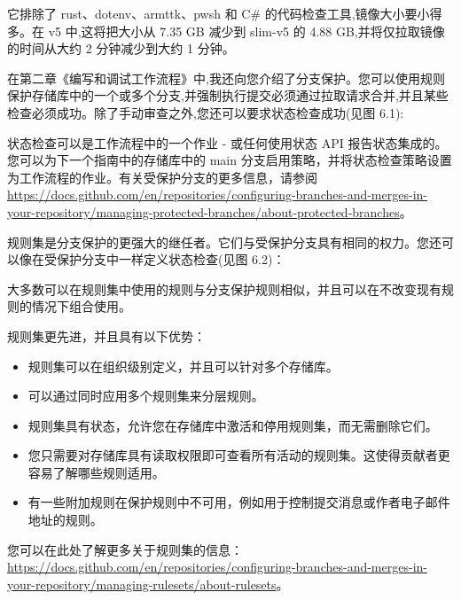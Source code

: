 它排除了 rust、dotenv、armttk、pwsh 和 C\# 的代码检查工具,镜像大小要小得多。在 v5 中,这将把大小从 7.35 GB 减少到 slim-v5 的 4.88 GB,并将仅拉取镜像的时间从大约 2 分钟减少到大约 1 分钟。


在第二章《编写和调试工作流程》中,我还向您介绍了分支保护。您可以使用规则保护存储库中的一个或多个分支,并强制执行提交必须通过拉取请求合并,并且某些检查必须成功。除了手动审查之外,您还可以要求状态检查成功(见图 6.1):


状态检查可以是工作流程中的一个作业 - 或任何使用状态 API 报告状态集成的。您可以为下一个指南中的存储库中的 main 分支启用策略，并将状态检查策略设置为工作流程的作业。有关受保护分支的更多信息，请参阅 \url{https://docs.github.com/en/repositories/configuring-branches-and-merges-in-your-repository/managing-protected-branches/about-protected-branches}。


规则集是分支保护的更强大的继任者。它们与受保护分支具有相同的权力。您还可以像在受保护分支中一样定义状态检查(见图 6.2)：


大多数可以在规则集中使用的规则与分支保护规则相似，并且可以在不改变现有规则的情况下组合使用。

规则集更先进，并且具有以下优势：

\begin{itemize}
\item 
规则集可以在组织级别定义，并且可以针对多个存储库。

\item
可以通过同时应用多个规则集来分层规则。

\item
规则集具有状态，允许您在存储库中激活和停用规则集，而无需删除它们。

\item
您只需要对存储库具有读取权限即可查看所有活动的规则集。这使得贡献者更容易了解哪些规则适用。

\item
有一些附加规则在保护规则中不可用，例如用于控制提交消息或作者电子邮件地址的规则。
\end{itemize}

您可以在此处了解更多关于规则集的信息：\url{https://docs.github.com/en/repositories/configuring-branches-and-merges-in-your-repository/managing-rulesets/about-rulesets}。